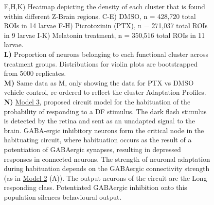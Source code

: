 \documentclass[9pt,lineno]{RandlettLab_elife}
\begin{document}
\begin{figure}
\begin{fullwidth}
\begin{center}
{E,H,K) Heatmap depicting the density of each cluster that is found within different Z-Brain regions.
C-E) DMSO, n = 428,720 total ROIs in 14 larvae F-H) Picrotoxinin (PTX), n = 271,037 total ROIs in 9 larvae I-K) Melatonin treatment, n = 350,516 total ROIs in 11 larvae.
\\ \textbf{L)} Proportion of neurons belonging to each functional cluster across treatment groups. Distributions for violin plots are bootstrapped from 5000 replicates. 
\\ \textbf{M)} Same data as M, only showing the data for PTX vs DMSO vehicle control, re-ordered to reflect the cluster Adaptation Profiles. 
\\ \textbf{N)} \underline{Model 3}, proposed circuit model for the habituation of the probability of responding to a DF stimulus. The dark flash stimulus is detected by the retina and sent as an unadapted signal to the brain. GABA-ergic inhibitory neurons form the critical node in the habituating circuit, where habituation occurs as the result of a potentiation of GABAergic synapses, resulting in depressed responses in connected neurons. The strength of neuronal adaptation during habituation depends on the GABAergic connectivity strength (as in  \underline{Model 2} (A)). The output neurons of the circuit are the Long-responding class. Potentiated GABAergic inhibition onto this population silences behavioural output. 
}
\label{fig:8}
\end{center}
\end{fullwidth}
\end{figure}
\end{document}
